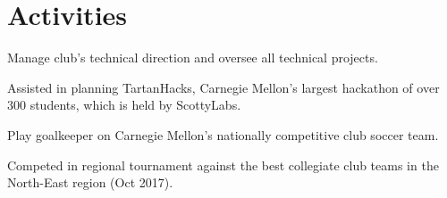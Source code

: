 \documentclass[]{openfont}
\begin{document}
\begin{minipage}[t]{0.59\textwidth}
\sectionsep


\section{Activities} 
\begin{tightemize}
    \item Manage club's technical direction and oversee all technical projects.
    \item Assisted in planning TartanHacks, Carnegie Mellon's largest hackathon of over 300 students, which is held by ScottyLabs.
\end{tightemize}

\sectionsep

\begin{tightemize}
    \item Play goalkeeper on Carnegie Mellon's nationally competitive club soccer team.
    \item Competed in regional tournament against the best collegiate club teams in the North-East region (Oct 2017).
\end{tightemize}

\sectionsep

\end{minipage} 
\end{document}
